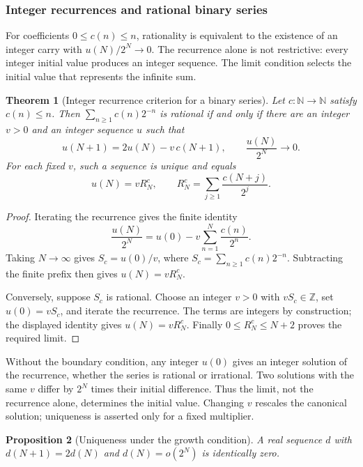 \documentclass[11pt]{article}
\theoremstyle{plain}
\newtheorem{thm}{Theorem}[section]
\newtheorem{prop}[thm]{Proposition}
\theoremstyle{definition}
\theoremstyle{remark}
\newcommand{\N}{\mathbb{N}}
\newcommand{\Z}{\mathbb{Z}}
\begin{document}
\subsubsection{Integer recurrences and rational binary series}

For coefficients $0\le c(n)\le n$, rationality is equivalent to the
existence of an integer carry with $u(N)/2^N\to0$. The recurrence alone
is not restrictive: every integer initial value produces an integer
sequence. The limit condition selects the initial value that represents
the infinite sum.


\begin{thm}[Integer recurrence criterion for a binary series]
\label{thm:binary-carry-criterion}
Let $c:\N\to\N$ satisfy $c(n)\le n$. Then
$\sum_{n\ge1}c(n)2^{-n}$ is rational if and only if there are an integer
$v>0$ and an integer sequence $u$ such that
\[
 u(N+1)=2u(N)-v\,c(N+1),\qquad \frac{u(N)}{2^N}\longrightarrow0.
\]
For each fixed $v$, such a sequence is unique and equals
\[
 u(N)=vR^c_N,\qquad R^c_N=\sum_{j\ge1}\frac{c(N+j)}{2^j}.
\]
\end{thm}

\begin{proof}
Iterating the recurrence gives the finite identity
\[
 \frac{u(N)}{2^N}=u(0)-v\sum_{n=1}^N\frac{c(n)}{2^n}.
\]
Taking $N\to\infty$ gives $S_c=u(0)/v$, where
$S_c=\sum_{n\ge1}c(n)2^{-n}$. Subtracting the finite prefix then gives
$u(N)=vR^c_N$.

Conversely, suppose $S_c$ is rational. Choose an integer $v>0$ with
$vS_c\in\Z$, set $u(0)=vS_c$, and iterate the recurrence. The terms
are integers by construction; the displayed identity gives
$u(N)=vR^c_N$. Finally $0\le R^c_N\le N+2$ proves the required limit.
\end{proof}

Without the boundary condition, any integer $u(0)$ gives an integer
solution of the recurrence, whether the series is rational or irrational.
Two solutions with the same $v$ differ by $2^N$ times their initial
difference. Thus the limit, not the recurrence alone, determines the
initial value. Changing $v$ rescales the canonical solution; uniqueness
is asserted only for a fixed multiplier.

\begin{prop}[Uniqueness under the growth condition]\label{prop:uniqueness-under-growth-condition}
A real sequence $d$ with $d(N{+}1)=2d(N)$ and $d(N)=o(2^N)$ is identically
zero.
\end{prop}
\end{document}
